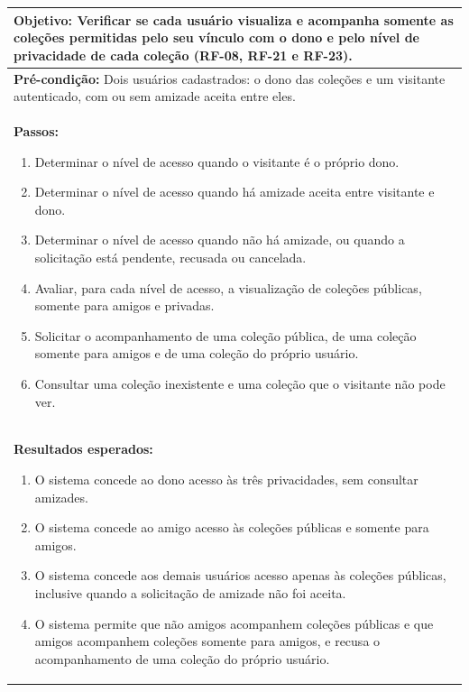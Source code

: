 \FloatBarrier
\begin{quadro}[h!]
\caption{Caso de teste CT04: validar o acesso a coleções conforme privacidade e amizade}
\label{quad:ct04}
\begin{tabular}{|p{\dimexpr\linewidth-2\tabcolsep-2\arrayrulewidth\relax}|}
\hline
\textbf{Objetivo:} Verificar se cada usuário visualiza e acompanha somente as coleções permitidas pelo seu vínculo com o dono e pelo nível de privacidade de cada coleção (RF-08, RF-21 e RF-23). \\ \hline
\textbf{Pré-condição:} Dois usuários cadastrados: o dono das coleções e um visitante autenticado, com ou sem amizade aceita entre eles. \\ \hline
\textbf{Passos:}
\begin{enumerate}[nosep,leftmargin=1.2em,topsep=2pt,partopsep=0pt,parsep=0pt,itemsep=1pt]
  \item Determinar o nível de acesso quando o visitante é o próprio dono.
  \item Determinar o nível de acesso quando há amizade aceita entre visitante e dono.
  \item Determinar o nível de acesso quando não há amizade, ou quando a solicitação está pendente, recusada ou cancelada.
  \item Avaliar, para cada nível de acesso, a visualização de coleções públicas, somente para amigos e privadas.
  \item Solicitar o acompanhamento de uma coleção pública, de uma coleção somente para amigos e de uma coleção do próprio usuário.
  \item Consultar uma coleção inexistente e uma coleção que o visitante não pode ver.
\end{enumerate} \\ \hline
\textbf{Resultados esperados:}
\begin{enumerate}[nosep,leftmargin=1.2em,topsep=2pt,partopsep=0pt,parsep=0pt,itemsep=1pt]
  \item O sistema concede ao dono acesso às três privacidades, sem consultar amizades.
  \item O sistema concede ao amigo acesso às coleções públicas e somente para amigos.
  \item O sistema concede aos demais usuários acesso apenas às coleções públicas, inclusive quando a solicitação de amizade não foi aceita.
  \item O sistema permite que não amigos acompanhem coleções públicas e que amigos acompanhem coleções somente para amigos, e recusa o acompanhamento de uma coleção do próprio usuário.

\end{enumerate}
\end{tabular}
\end{quadro}
